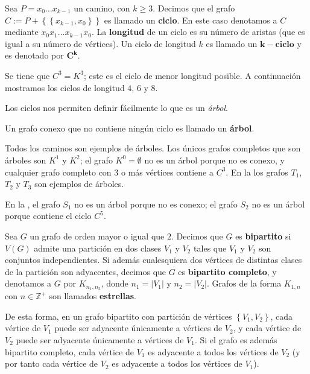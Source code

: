 \begin{Def}
   Sea $P=x_0\dots x_{k-1}$ un camino, con $k\geq 3$. Decimos que el grafo $C:=P+\left\lbrace \left\lbrace x_{k-1}, x_0\right\rbrace\right\rbrace$ es llamado un \textbf{ciclo}. En este caso denotamos a $C$ mediante $x_0x_1\dots x_{k-1}x_0$. La \textbf{longitud} de un ciclo es su número de aristas (que es igual a su número de vértices). Un ciclo de longitud $k$ es llamado un $\bm{k-ciclo}$ y es denotado por $\bm{C^k}$. 
\end{Def}
\begin{Ejm}
   Se tiene que $C^3=K^3$; este es el ciclo de menor longitud posible. A continuación mostramos los ciclos de longitud $4$, $6$ y $8$.
   
\end{Ejm}
Los ciclos nos permiten definir fácilmente lo que es un \textit{árbol}.
\begin{Def}
   Un grafo conexo que no contiene ningún ciclo es llamado un \textbf{árbol}. 
\end{Def}
\begin{Ejm}
   Todos los caminos son ejemplos de árboles. Los únicos grafos completos que son árboles son $K^1$ y $K^2$; el grafo $K^0=\emptyset$ no es un árbol porque no es conexo, y cualquier grafo completo con $3$ o más vértices contiene a $C^3$. En la  los grafos $T_1$, $T_2$ y $T_3$ son ejemplos de árboles.
   
   En la , el grafo $S_1$ no es un árbol porque no es conexo; el grafo $S_2$ no es un árbol porque contiene el ciclo $C^5$.
   
\end{Ejm}
\begin{Def}
   Sea $G$ un grafo de orden mayor o igual que $2$. Decimos que $G$ es \textbf{bipartito} si $V(G)$ admite una partición en dos clases $V_1$ y $V_2$ tales que $V_1$ y $V_2$ son conjuntos independientes. Si además cualesquiera dos vértices de distintas clases de la partición son adyacentes, decimos que $G$ es \textbf{bipartito completo}, y denotamos a $G$ por $K_{n_1,n_2}$, donde $n_1=|V_1|$ y $n_2=|V_2|$. Grafos de la forma $K_{1,n}$ con $n\in \mathbb{Z}^+$ son llamados \textbf{estrellas}.
\end{Def}
De esta forma, en un grafo bipartito con partición de vértices $\left\lbrace V_1,V_2\right\rbrace$, cada vértice de $V_1$ puede ser adyacente únicamente a vértices de $V_2$, y cada vértice de $V_2$ puede ser adyacente únicamente a vértices de $V_1$. Si el grafo es además bipartito completo, cada vértice de $V_1$ es adyacente a todos los vértices de $V_2$ (y por tanto cada vértice de $V_2$ es adyacente a todos los vértices de $V_1$).\\\\
